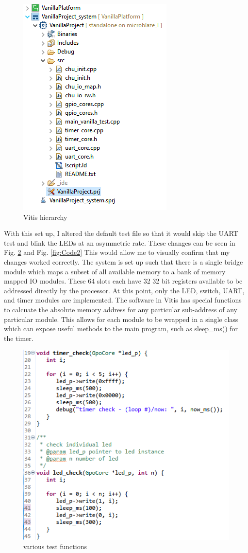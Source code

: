 \documentclass{article}
\begin{document}
	 \begin{figure}[H]
		\centering
		\includegraphics[width=.6\linewidth]{VitisSC}
		\caption{Vitis hierarchy}
		\label{fig:Vitis}
	\end{figure}
	
		With this set up, I altered the default test file so that it would skip the UART test and blink the LEDs at an asymmetric rate. These changes can be seen in Fig. \ref{fig:Code1} and Fig. \ref{fig:Code2} This would allow me to visually confirm that my changes worked correctly. The system is set up such that there is a single bridge module which maps a subset of all available memory to a bank of memory mapped IO modules. These 64 slots each have 32 32 bit registers available to be addressed directly by the processor. At this point, only the LED, switch, UART, and timer modules are implemented. The software in Vitis has special functions to calcuate the absolute memory address for any particular sub-address of any particular module. This allows for each module to be wrapped in a single class which can expose useful methods to the main program, such as sleep\_ms() for the timer.
		
		 \begin{figure}[H]
			\centering
			\includegraphics[width=.6\linewidth]{CodeSC1}
			\caption{various test functions}
			\label{fig:Code1}
		\end{figure}
		
\end{document}
